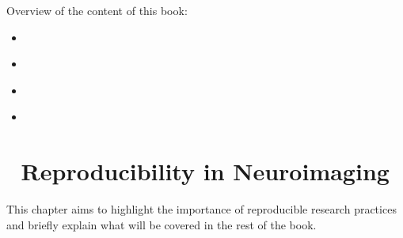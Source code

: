 \documentclass[letterpaper,10pt,english]{jupyterBook}
\begin{document}
\begin{DUlineblock}{0em}
\item[] 
\end{DUlineblock}

\sphinxAtStartPar
Overview of the content of this book:
\begin{itemize}
\item {} 
\sphinxAtStartPar
{\hyperref[\detokenize{chapters/01/reproducibility-in-neuroimaging::doc}]{}}

\item {} 
\sphinxAtStartPar
{\hyperref[\detokenize{chapters/02/reproducible-analysis-pipelines::doc}]{}}

\item {} 
\sphinxAtStartPar
{\hyperref[\detokenize{chapters/03/reproducible-visualizations::doc}]{}}

\item {} 
\sphinxAtStartPar
{\hyperref[\detokenize{chapters/04/references::doc}]{}}

\end{itemize}

\sphinxstepscope


\chapter{📗 Reproducibility in Neuroimaging}
\label{\detokenize{chapters/01/reproducibility-in-neuroimaging:reproducibility-in-neuroimaging}}\label{\detokenize{chapters/01/reproducibility-in-neuroimaging::doc}}
\sphinxAtStartPar
This chapter aims to highlight the importance of reproducible research practices and briefly explain what will be covered in the rest of the book.
\end{document}
